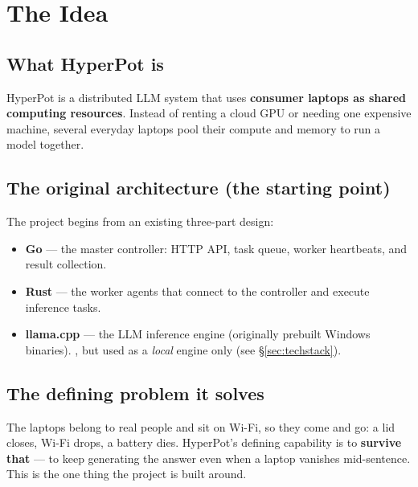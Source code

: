 \section{The Idea}
\label{sec:idea}

\subsection{What HyperPot is}
HyperPot is a distributed LLM system that uses \textbf{consumer laptops as shared
computing resources}. Instead of renting a cloud GPU or needing one expensive
machine, several everyday laptops pool their compute and memory to run a model
together.

\subsection{The original architecture (the starting point)}
The project begins from an existing three-part design:

\begin{itemize}[leftmargin=1.4em,nosep]
  \item \textbf{Go} --- the master controller: HTTP API, task queue, worker
  heartbeats, and result collection. \Keep
  \item \textbf{Rust} --- the worker agents that connect to the controller and
  execute inference tasks. \Keep
  \item \textbf{llama.cpp} --- the LLM inference engine (originally prebuilt
  Windows binaries). \Keep, but used as a \emph{local} engine only (see
  \S\ref{sec:techstack}).
\end{itemize}

\subsection{The defining problem it solves}
The laptops belong to real people and sit on Wi-Fi, so they come and go: a lid
closes, Wi-Fi drops, a battery dies. HyperPot's defining capability is to
\textbf{survive that} --- to keep generating the answer even when a laptop
vanishes mid-sentence. This is the one thing the project is built around.

